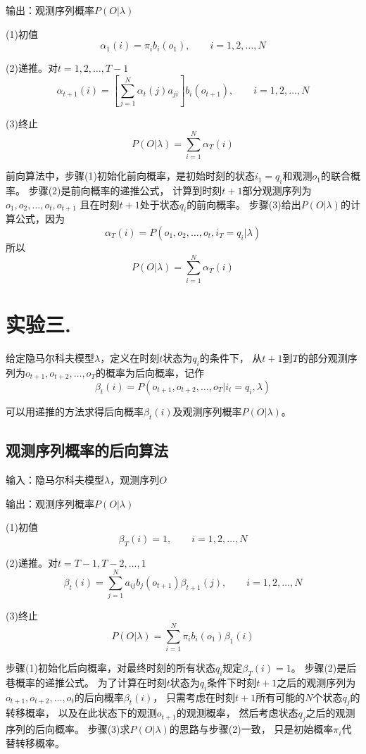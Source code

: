 \documentclass[a4paper,UTF8]{article}
\theoremstyle{definition}
\begin{document}
输出：观测序列概率$P(O \vert \lambda)$

(1)初值
\[
	\alpha_1(i)=\pi_ib_i(o_1),\qquad i=1,2,\dots,N
\]

(2)递推。对$t=1,2,\dots,T-1$
\[
	\alpha_{t+1}(i)=[\sum_{j=1}^N \alpha_t(j)a_{ji}]b_i(o_{t+1}),
	\qquad i=1,2,\dots,N
\]

(3)终止
\[
	P(O \vert \lambda)=\sum_{i=1}^N\alpha_T(i)
\]

前向算法中，步骤(1)初始化前向概率，是初始时刻的状态$i_1=q_i$和观测$o_1$的联合概率。
步骤(2)是前向概率的递推公式，
计算到时刻$t+1$部分观测序列为$o_1,o_2,\dots,o_t,o_{t+1}$
且在时刻$t+1$处于状态$q_i$的前向概率。
步骤(3)给出$P(O \vert \lambda)$的计算公式，因为
\[
	\alpha_T(i)=P(o_1,o_2,\dots,o_t,i_T=q_i \vert \lambda)
\]
所以
\[
	P(O \vert \lambda)=\sum_{i=1}^N \alpha_T(i)
\]

\section*{实验三.}

给定隐马尔科夫模型$\lambda$，定义在时刻$t$状态为$q_i$的条件下，
从$t+1$到$T$的部分观测序列为$o_{t+1},o_{t+2},\dots,o_T$的概率为后向概率，记作
\[
	\beta_t(i)=P(o_{t+1},o_{t+2},\dots,o_T \vert i_t=q_i,\lambda)
\]

可以用递推的方法求得后向概率$\beta_t(i)$及观测序列概率$P(O \vert \lambda)$。

\subsection*{观测序列概率的后向算法}

输入：隐马尔科夫模型$\lambda$，观测序列$O$

输出：观测序列概率$P(O \vert \lambda)$

(1)初值
\[
	\beta_T(i)=1,\qquad i=1,2,\dots,N
\]

(2)递推。对$t=T-1,T-2,\dots,1$
\[
	\beta_t(i)=\sum_{j=1}^N a_{ij}b_j(o_{t+1})\beta_{t+1}(j),
	\qquad i=1,2,\dots,N
\]

(3)终止
\[
	P(O \vert \lambda)=\sum_{i=1}^N \pi_ib_i(o_1)\beta_1(i)
\]

步骤(1)初始化后向概率，对最终时刻的所有状态$q_i$规定$\beta_T(i)=1$。
步骤(2)是后巷概率的递推公式。
为了计算在时刻$t$状态为$q_i$条件下时刻$t+1$之后的观测序列为
$o_{t+1},o_{t+2},\dots,o_t$的后向概率$\beta_t(i)$，
只需考虑在时刻$t+1$所有可能的$N$个状态$q_j$的转移概率，
以及在此状态下的观测$o_{t+1}$的观测概率，
然后考虑状态$q_j$之后的观测序列的后向概率。
步骤(3)求$P(O \vert \lambda)$的思路与步骤(2)一致，
只是初始概率$\pi_i$代替转移概率。

\nocite{*}

\end{document}
